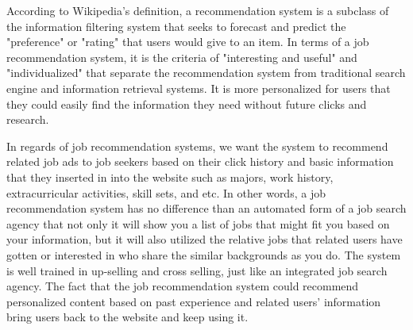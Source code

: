 \documentclass[sigconf]{acmart}
\begin{document}
\par According to Wikipedia's definition, a recommendation system  is a subclass of the information filtering system that seeks to forecast and predict the "preference" or "rating" that users would give to an item. In terms of a job recommendation system, it is the criteria of  "interesting and useful" and "individualized" that separate the recommendation system from traditional search engine and information retrieval systems. It is more personalized for users that they could easily find the information they need without future clicks and research.

\par In regards of job recommendation systems, we want the system to recommend related job ads to job seekers based on their click history and basic information that they inserted in into the website such as majors, work history, extracurricular activities, skill sets, and etc. In other words, a job recommendation system has no difference than an automated form of a job search agency that not only it will show you a list of jobs that might fit you based on your information, but it will also utilized the relative jobs that related users have gotten or interested in who share the similar backgrounds as you do. The system is well trained in up-selling and cross selling, just like an integrated job search agency. The fact that the job recommendation system could recommend personalized content based on past experience and related users' information bring users back to the website and keep using it. 
\end{document}

